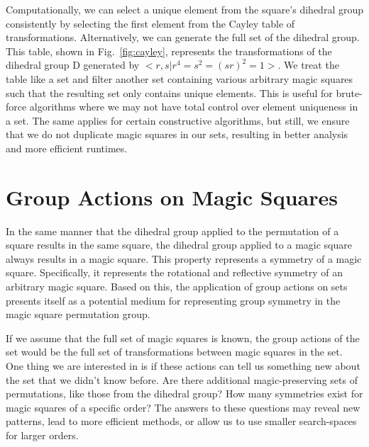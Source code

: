 \documentclass[12pt]{report}
\begin{document}
\par Computationally, we can select a unique element from the square's dihedral group consistently
by selecting the first element from the Cayley table of transformations. Alternatively, we can
generate the full set of the dihedral group. This table, shown in Fig.~\ref{fig:cayley}, represents
the transformations of the dihedral group D generated by $<r,s\vert
  r^4=s^2={\left(sr\right)}^2=1>$. We treat the table like a set and filter another set containing
various arbitrary magic squares such that the resulting set only contains unique elements. This is
useful for brute-force algorithms where we may not have total control over element uniqueness in a
set. The same applies for certain constructive algorithms, but still, we ensure that we do not
duplicate magic squares in our sets, resulting in better analysis and more efficient runtimes.

\section{Group Actions on Magic Squares}

\par In the same manner that the dihedral group applied to the permutation of a square results in
the same square, the dihedral group applied to a magic square always results in a magic square.
This property represents a symmetry of a magic square. Specifically, it represents the rotational
and reflective symmetry of an arbitrary magic square. Based on this, the application of group
actions on sets presents itself as a potential medium for representing group symmetry in the magic
square permutation group.

\par If we assume that the full set of magic squares is known, the group actions of the set would
be the full set of transformations between magic squares in the set. One thing we are interested in
is if these actions can tell us something new about the set that we didn't know before. Are there
additional magic-preserving sets of permutations, like those from the dihedral group? How many
symmetries exist for magic squares of a specific order? The answers to these questions may reveal
new patterns, lead to more efficient methods, or allow us to use smaller search-spaces for larger
orders.
\end{document}

